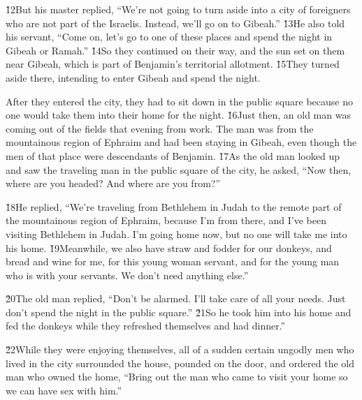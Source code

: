 \v{12}But his master replied, ``We're not going to turn aside into a city of foreigners who are not part of the Israelis. Instead, we'll go on to Gibeah.'' \v{13}He also told his servant, ``Come on, let's go to one of these places and spend the night in Gibeah or Ramah.'' \v{14}So they continued on their way, and the sun set on them near Gibeah, which is part of Benjamin's territorial allotment. \v{15}They turned aside there, intending to enter Gibeah and spend the night.

After they entered the city, they had to sit down in the public square because no one would take them into their home for the night. \v{16}Just then, an old man was coming out of the fields that evening from work. The man was from the mountainous region of Ephraim and had been staying in Gibeah, even though the men of that place were descendants of Benjamin. \v{17}As the old man looked up and saw the traveling man in the public square of the city, he asked, ``Now then, where are you headed? And where are you from?''

\v{18}He replied, ``We're traveling from Bethlehem in Judah to the remote part of the mountainous region of Ephraim, because I'm from there, and I've been visiting Bethlehem in Judah. I'm going home now, but no one will take me into his home. \v{19}Meanwhile, we also have straw and fodder for our donkeys, and bread and wine for me, for this young woman servant, and for the young man who is with your servants. We don't need anything else.''

\v{20}The old man replied, ``Don't be alarmed. I'll take care of all your needs. Just don't spend the night in the public square.'' \v{21}So he took him into his home and fed the donkeys while they refreshed themselves and had dinner.''

\v{22}While they were enjoying themselves, all of a sudden certain ungodly men who lived in the city surrounded the house, pounded on the door, and ordered the old man who owned the home, ``Bring out the man who came to visit your home so we can have sex with him.''

